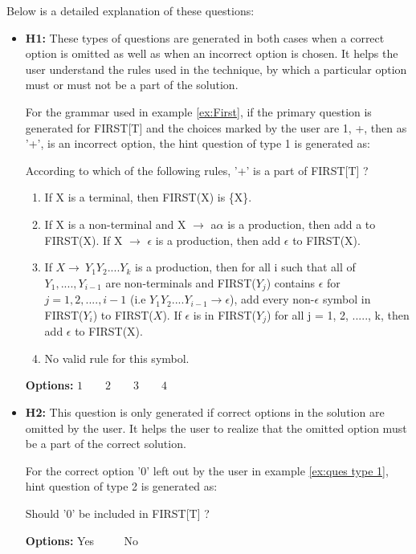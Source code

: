 Below is a detailed explanation of these questions:
\begin{itemize}
\item \textbf{H1:}
These types of questions are generated in both cases when a correct option is omitted as well as when an incorrect option is chosen. It helps the user understand the rules used in the technique, by which a particular option must or must not be a part of the solution.
\begin{example}
\label{ex:ques type 1}
For the grammar used in example \ref{ex:First}, if the primary question is generated for FIRST[T] and the choices marked by the user are {1, +}, then as '+', is an incorrect option, the hint question of type 1 is generated as:

According to which of the following rules, '+' is a part of FIRST[T] ?  
\begin{enumerate}
\item If X is a terminal, then FIRST(X) is \{X\}.
\item If X is a non-terminal and X $\to$ a$\alpha$ is a production, then add a to FIRST(X). If X $\to$ $\epsilon$ is a production, then add $\epsilon$ to FIRST(X).
\item If $X \to\ Y_1Y_2....Y_k$ is a production, then for all i such that all of $Y_1,....,Y_{i-1}$ are non-terminals and FIRST($Y_j$) contains $\epsilon$ for $j = 1, 2, ...., i-1$ (i.e $Y_1Y_2....Y_{i-1} \to \epsilon$), add every non-$\epsilon$ symbol in FIRST($Y_i$) to FIRST($X$). If $\epsilon$ is in FIRST($Y_j$) for all j = 1, 2, ....., k, then add $\epsilon$ to FIRST(X).
\item No valid rule for this symbol.
\end{enumerate}
\end{example}
\textbf{Options:} $1 \qquad 2 \qquad 3 \qquad 4$

\item \textbf{H2:}
This question is only generated if correct options in the solution are omitted by the user. It helps the user to realize that the omitted option must be a part of the correct solution.
\begin{example}
\label{ex:ques type 2}
For the correct option '0' left out by the user in example \ref{ex:ques type 1}, hint question of type 2 is generated as:

Should '0' be included in FIRST[T] ?

\textbf{Options:} Yes $\qquad$ No
\end{example}
\end{itemize}

